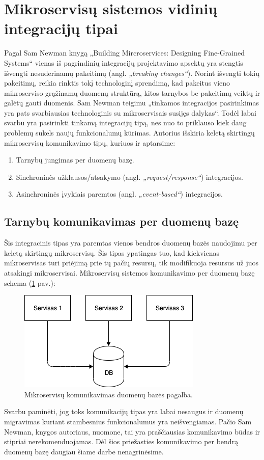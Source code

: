 \section{Mikroservisų sistemos vidinių integracijų tipai}
Pagal Sam Newman knygą „Building Mircroservices: Designing Fine-Grained Systems“ \cite{Bk2} vienas iš pagrindinių
integracijų projektavimo apsektų yra stengtis išvengti nesuderinamų pakeitimų (angl. \textit{„breaking changes“}).
Norint išvengti tokių pakeitimų, reikia rinktis tokį technologinį sprendimą, kad pakeitus vieno mikroserviso grąžinamų
duomenų struktūrą, kitos tarnybos be pakeitimų veiktų ir galėtų gauti duomenis.
Sam Newman teigimu „tinkamos integracijos pasirinkimas yra pats svarbiausias technologinis su mikroservisais susijęs dalykas“.
Todėl labai svarbu yra pasirinkti tinkamą integracijų tipą, nes nuo to priklauso kiek daug problemų sukels naujų funkcionalumų kūrimas.
Autorius išskiria keletą skirtingų mikroservisų komunikavimo tipų, kuriuos ir aptarsime:
\begin{enumerate}
	\item Tarnybų jungimas per duomenų bazę.
	\item Sinchroninės užklausos/atsakymo (angl. \textit{„request/response“}) integracijos.
	\item Asinchroninės įvykiais paremtos (angl. \textit{„event-based“}) integracijos.
\end{enumerate}

\break

\subsection{Tarnybų komunikavimas per duomenų bazę}
Šis integracinis tipas yra paremtas vienos bendros duomenų bazės naudojimu per keletą skirtingų mikroservisų.
Šis tipas ypatingas tuo, kad kiekvienas mikroservisas turi priėjimą prie tų pačių resursų, tik modifikuoja resursus
už juos atsakingi mikroservisai. Mikroservisų sistemos komunikavimo per duomenų bazę schema (\ref{img:db-communication} pav.):

\begin{figure}[H]
  \centering
  \includegraphics[scale=0.8]{img/db-communication}
  \caption{Mikroservisų komunikavimas duomenų bazės pagalba.}
  \label{img:db-communication}
\end{figure}

Svarbu paminėti, jog toks komunikacijų tipas yra labai nesaugus ir duomenų migravimas kuriant stambesnius funkcionalumus yra neišvengiamas.
Pačio Sam Newman, knygos \cite{Bk2} autoriaus, nuomone, tai yra praščiausias komunikavimo būdas ir stipriai nerekomenduojamas.
Dėl šios priežasties komunikavimo per bendrą duomenų bazę daugiau šiame darbe nenagrinėsime.